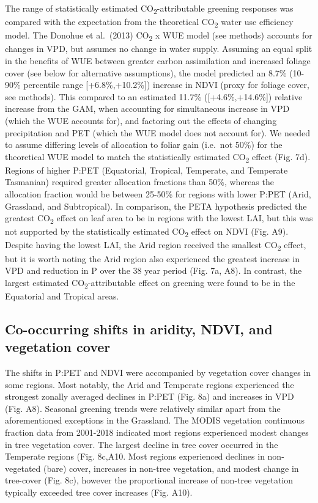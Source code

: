 \documentclass[gc, manuscript]{copernicus}
\begin{document}
The range of statistically estimated CO\textsubscript{2}-attributable
greening responses was compared with the expectation from the
theoretical CO\textsubscript{2} water use efficiency model. The Donohue
et al.~(2013) CO\textsubscript{2} x WUE model (see methods) accounts for
changes in VPD, but assumes no change in water supply. Assuming an equal
split in the benefits of WUE between greater carbon assimilation and
increased foliage cover (see below for alternative assumptions), the
model predicted an 8.7\% (10-90\% percentile range {[}+6.8\%,+10.2\%{]})
increase in NDVI (proxy for foliage cover, see methods). This compared
to an estimated 11.7\% ({[}+4.6\%,+14.6\%{]}) relative increase from the
GAM, when accounting for simultaneous increase in VPD (which the WUE
accounts for), and factoring out the effects of changing precipitation
and PET (which the WUE model does not account for). We needed to assume
differing levels of allocation to foliar gain (i.e.~not 50\%) for the
theoretical WUE model to match the statistically estimated
CO\textsubscript{2} effect (Fig. 7d). Regions of higher P:PET
(Equatorial, Tropical, Temperate, and Temperate Tasmanian) required
greater allocation fractions than 50\%, whereas the allocation fraction
would be between 25-50\% for regions with lower P:PET (Arid, Grassland,
and Subtropical). In comparison, the PETA hypothesis
\citep{donohue_etal17} predicted the greatest CO\textsubscript{2} effect
on leaf area to be in regions with the lowest LAI, but this was not
supported by the statistically estimated CO\textsubscript{2} effect on
NDVI (Fig. A9). Despite having the lowest LAI, the Arid region received
the smallest CO\textsubscript{2} effect, but it is worth noting the Arid
region also experienced the greatest increase in VPD and reduction in P
over the 38 year period (Fig. 7a, A8). In contrast, the largest
estimated CO\textsubscript{2}-attributable effect on greening were found
to be in the Equatorial and Tropical areas.

\subsection{Co-occurring shifts in aridity, NDVI, and vegetation cover}

The shifts in P:PET and NDVI were accompanied by vegetation cover
changes in some regions. Most notably, the Arid and Temperate regions
experienced the strongest zonally averaged declines in P:PET (Fig. 8a)
and increases in VPD (Fig. A8). Seasonal greening trends were relatively
similar apart from the aforementioned exceptions in the Grassland. The
MODIS vegetation continuous fraction data from 2001-2018 indicated most
regions experienced modest changes in tree vegetation cover. The largest
decline in tree cover occurred in the Temperate regions (Fig. 8c,A10.
Most regions experienced declines in non-vegetated (bare) cover,
increases in non-tree vegetation, and modest change in tree-cover (Fig.
8c), however the proportional increase of non-tree vegetation typically
exceeded tree cover increases (Fig. A10).
\end{document}
